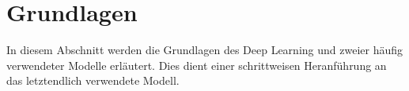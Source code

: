 \section{Grundlagen}
\label{sec:Grundlagen}

In diesem Abschnitt werden die Grundlagen des Deep Learning und zweier häufig verwendeter Modelle erläutert.
Dies dient einer schrittweisen Heranführung an das letztendlich verwendete Modell.






